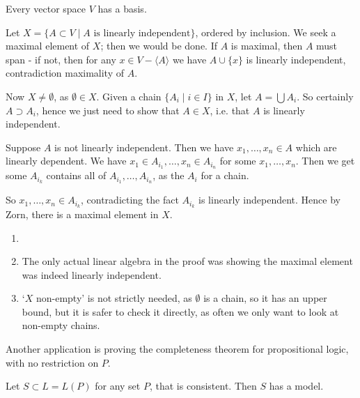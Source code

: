 \documentclass[12pt]{article}
\begin{document}
\begin{theorem}
	Every vector space $V$ has a basis.
\end{theorem}

\begin{proofbox}
	Let $X = \{A \subset V \mid A \text{ is linearly independent}\}$, ordered by inclusion. We seek a maximal element of $X$; then we would be done. If $A$ is maximal, then $A$ must span - if not, then for any $x \in V - \langle A \rangle$ we have $A \cup \{x\}$ is linearly independent, contradiction maximality of $A$.

	Now $X \neq \emptyset$, as $\emptyset \in X$. Given a chain $\{A_i \mid i \in I\}$ in $X$, let $A = \bigcup A_i$. So certainly $A \supset A_i$, hence we just need to show that $A \in X$, i.e. that $A$ is linearly independent.

	Suppose $A$ is not linearly independent. Then we have $x_1, \ldots, x_n \in A$ which are linearly dependent. We have $x_1 \in A_{i_1}, \ldots, x_n \in A_{i_n}$ for some $x_1, \ldots, x_n$. Then we get some $A_{i_k}$ contains all of $A_{i_1}, \ldots, A_{i_n}$, as the $A_i$ for a chain.

	So $x_1, \ldots, x_n \in A_{i_k}$, contradicting the fact $A_{i_k}$ is linearly independent. Hence by Zorn, there is a maximal element in $X$.
\end{proofbox}

\begin{remark}
	\begin{enumerate}
		\item[]
		\item The only actual linear algebra in the proof was showing the maximal element was indeed linearly independent.
		\item `$X$ non-empty' is not strictly needed, as $\emptyset$ is a chain, so it has an upper bound, but it is safer to check it directly, as often we only want to look at non-empty chains.
	\end{enumerate}
\end{remark}

Another application is proving the completeness theorem for propositional logic, with no restriction on $P$.

\begin{theorem}
	Let $S \subset L = L(P)$ for any set $P$, that is consistent. Then $S$ has a model.
\end{theorem}
\end{document}
